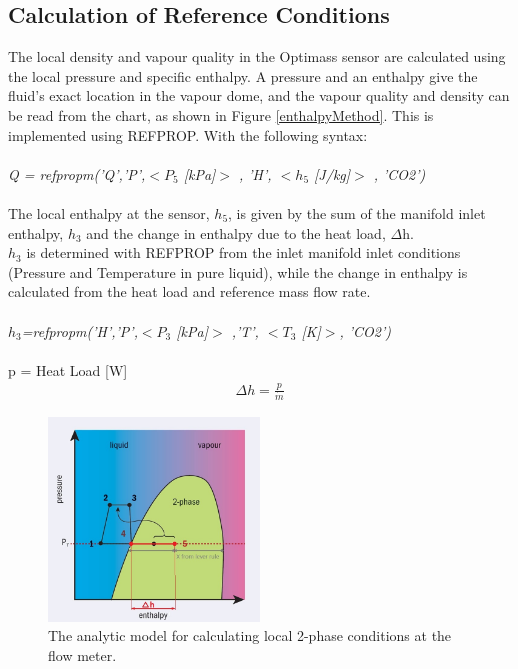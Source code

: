 \documentclass{report}
\begin{document}
\subsection{Calculation of Reference Conditions}
The local density and vapour quality in the Optimass sensor are calculated using the local pressure and specific enthalpy. 
A pressure and an enthalpy give the fluid's exact location in the vapour dome, and the vapour quality and density can be read from the chart, as shown in Figure \ref{enthalpyMethod}. This is implemented using REFPROP. With the following syntax: \\\\
\textit{Q = refpropm('Q','P',$<P_5$ [kPa]$>$ , 'H', $<h_5$ [J/kg]$>$ , 'CO2')} \\\\
The local enthalpy at the sensor, \textit{$h_5$}, is given by the sum of the manifold inlet enthalpy, $h_3$ and the change in enthalpy due to the heat load, $\Delta$h.\\
\textit{$h_3$} is determined with REFPROP from the inlet manifold inlet conditions (Pressure and Temperature in pure liquid), while the change in enthalpy is calculated from the heat load and reference mass flow rate.\\\\
\textit{$h_3$=refpropm('H','P',$<P_3$ [kPa]$>$ ,'T', $<T_3$ [K]$>$, 'CO2')}\\\\
p = Heat Load [W]\\
\begin{eqnarray}
\Delta h=\frac{p}{\dot{m}}
\end{eqnarray}
\begin{figure}
\includegraphics[width=0.5\textwidth]{enthalpyMethod.jpg}
\caption{The analytic model for calculating local 2-phase conditions at the flow meter.}
\label{fig:enthalpyMethod}
\end{figure}
\end{document}

